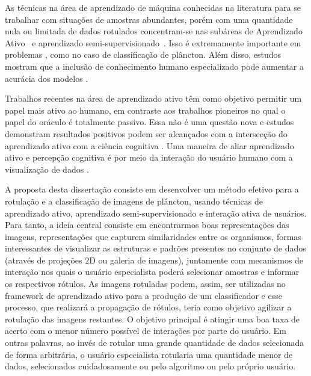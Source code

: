 As técnicas na área de aprendizado de máquina conhecidas na literatura para se trabalhar com situações de amostras abundantes, porém com uma quantidade nula ou limitada de dados rotulados concentram-se nas subáreas de Aprendizado Ativo~\citep{settles2014active} e aprendizado semi-supervisionado~\citep{zhu2006semi}.   Isso é extremamente importante em problemas  \citep{saito2014active}, como no caso de classificação de plâncton. Além disso, estudos mostram que a inclusão de conhecimento humano especializado pode aumentar a acurácia dos modelos \citep{benfield2007rapid}.

Trabalhos recentes na área de aprendizado ativo têm como objetivo permitir um papel mais ativo ao humano, em contraste aos trabalhos pioneiros no qual o papel do oráculo é totalmente passivo. Essa não é uma questão nova \citep{castro2009human, dasgupta2011two} e estudos demonstram resultados positivos podem ser alcançados com a intersecção do aprendizado ativo com a ciência cognitiva \citep{kottke2018other}. Uma maneira de aliar aprendizado ativo e percepção cognitiva é por meio da interação do usuário humano com a visualização de dados \citep{yang2018visually, bernard2018comparing, weigl2016mapview}.  


A proposta desta dissertação consiste em desenvolver um método efetivo para a rotulação e a classificação de imagens de plâncton, usando técnicas de aprendizado ativo, aprendizado semi-supervisionado e interação ativa de usuários. Para tanto, a ideia central consiste em encontrarmos boas representações das imagens, representações que capturem similaridades entre os organismos, formas interessantes de visualizar as estruturas e padrões presentes no conjunto de dados (através de projeções 2D ou galeria de imagens), juntamente com mecanismos de interação nos quais o usuário especialista poderá selecionar amostras e informar os respectivos  rótulos. As imagens rotuladas podem, assim, ser utilizadas no framework de aprendizado ativo para a produção de um classificador e esse processo, que realizará a propagação de rótulos, teria como objetivo agilizar a rotulação das imagens restantes. O objetivo principal é atingir uma boa taxa de acerto com o menor número possível de interações por parte do usuário. Em outras palavras, ao invés de rotular uma grande quantidade de dados selecionada de forma arbitrária, o usuário especialista rotularia uma quantidade menor de dados, selecionados cuidadosamente ou pelo algoritmo ou pelo próprio usuário.

